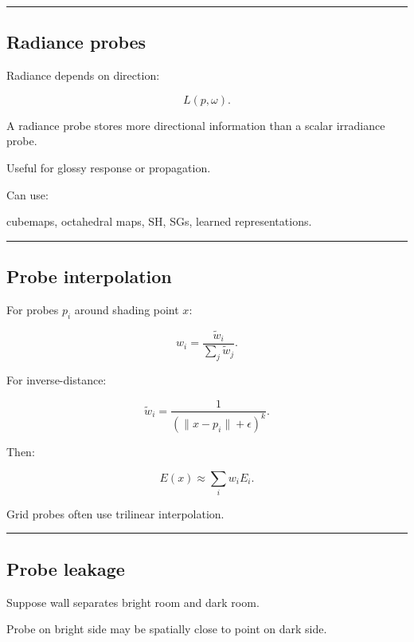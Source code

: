 \begin{center}\rule{0.5\linewidth}{0.5pt}\end{center}

\subsection{Radiance probes}\label{04-visual-computing-ii-ch040-radiance-probes}

Radiance depends on direction:

\[
L(p,\omega).
\]

A radiance probe stores more directional information than a scalar irradiance probe.

Useful for glossy response or propagation.

Can use:

cubemaps, octahedral maps, SH, SGs, learned representations.

\begin{center}\rule{0.5\linewidth}{0.5pt}\end{center}

\subsection{Probe interpolation}\label{04-visual-computing-ii-ch040-probe-interpolation}

For probes \(p_i\) around shading point \(x\):

\[
w_i=
\frac{
\tilde w_i
}{
\sum_j\tilde w_j
}.
\]

For inverse-distance:

\[
\tilde w_i=
\frac1{
(\|x-p_i\|+\epsilon)^k
}.
\]

Then:

\[
\boxed{
E(x)
\approx
\sum_iw_iE_i.
}
\]

Grid probes often use trilinear interpolation.

\begin{center}\rule{0.5\linewidth}{0.5pt}\end{center}

\subsection{Probe leakage}\label{04-visual-computing-ii-ch040-probe-leakage}

Suppose wall separates bright room and dark room.

Probe on bright side may be spatially close to point on dark side.

